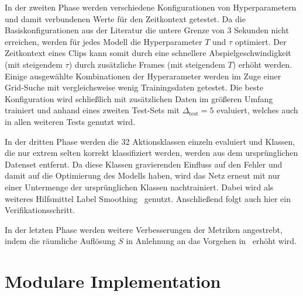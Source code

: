 In der zweiten Phase werden verschiedene Konfigurationen von Hyperparametern und damit verbundenen Werte für den Zeitkontext getestet.
Da die Basiskonfigurationen aus der Literatur die untere Grenze von 3 Sekunden nicht erreichen, werden für jedes Modell die Hyperparameter $T$ und $\tau$ optimiert.
Der Zeitkontext eines Clips kann somit durch eine schnellere Abspielgeschwindigkeit (mit steigendem $\tau$) \bzw durch zusätzliche Frames (mit steigendem $T$) erhöht werden.
Einige ausgewählte Kombinationen der Hyperarameter werden im Zuge einer Grid-Suche mit vergleichsweise wenig Trainingsdaten getestet.
Die beste Konfiguration wird schließlich mit zusätzlichen Daten im größeren Umfang trainiert und anhand eines zweiten Test-Sets mit $\Delta_\text{test}=5$ evaluiert, welches auch in allen weiteren Tests genutzt wird.

In der dritten Phase werden die 32 Aktionsklassen einzeln evaluiert und Klassen, die nur extrem selten korrekt klassifiziert werden, werden aus dem ursprünglichen Datenset entfernt.
Da diese Klassen gravierenden Einfluss auf den Fehler und damit auf die Optimierung des Modells haben, wird das Netz erneut mit nur einer Untermenge der ursprünglichen Klassen nachtrainiert.
Dabei wird als weiteres Hilfsmittel Label Smoothing~\cite{Szegedy16, Mueller20} genutzt.
Anschließend folgt auch hier ein Verifikationsschritt.

In der letzten Phase werden weitere Verbesserungen der Metriken angestrebt, indem die räumliche Auflösung $S$ in Anlehnung an das Vorgehen in~\cite{Wu20} erhöht wird.




\section{Modulare Implementation}
\label{sec:konzeptuelle-umsetzung}

